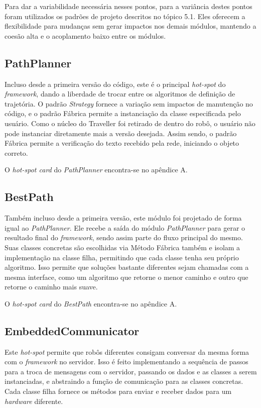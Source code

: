 Para dar a variabilidade necessária nesses pontos, para a variância destes pontos foram utilizados os padrões de projeto descritos no tópico 5.1. Eles oferecem a flexibilidade para mudanças sem gerar impactos nos demais módulos, mantendo a coesão alta e o acoplamento baixo entre os módulos.

\subsection{PathPlanner}

Incluso desde a primeira versão do código, este é o principal \textit{hot-spot} do \textit{framework}, dando a liberdade de trocar entre os algoritmos de definição de trajetória. O padrão \textit{Strategy} fornece a variação sem impactos de manutenção no código, e o padrão Fábrica permite a instanciação da classe especificada pelo usuário. Como o núcleo do Traveller foi retirado de dentro do robô, o usuário não pode instanciar diretamente mais a versão desejada. Assim sendo, o padrão Fábrica permite a verificação do texto recebido pela rede, iniciando o objeto correto.

O \textit{hot-spot card} do \textit{PathPlanner} encontra-se no apêndice A.

\subsection{BestPath}

Também incluso desde a primeira versão, este módulo foi projetado de forma igual ao \textit{PathPlanner}. Ele recebe a saída do módulo \textit{PathPlanner} para gerar o resultado final do \textit{framework}, sendo assim parte do fluxo principal do mesmo. Suas classes concretas são escolhidas via Método Fábrica também e isolam a implementação na classe filha, permitindo que cada classe tenha seu próprio algoritmo. Isso permite que soluções bastante diferentes sejam chamadas com a mesma interface, como um algoritmo que retorne o menor caminho e outro que retorne o caminho mais suave.

O \textit{hot-spot card} do \textit{BestPath} encontra-se no apêndice A.

\subsection{EmbeddedCommunicator}

Este \textit{hot-spot} permite que robôs diferentes consigam conversar da mesma forma com o \textit{framework} no servidor. Isso é feito implementando a sequência de passos para a troca de mensagens com o servidor, passando os dados e as classes a serem instanciadas, e abstraindo a função de comunicação para as classes concretas. Cada classe filha fornece os métodos para enviar e receber dados para um \textit{hardware} diferente.

